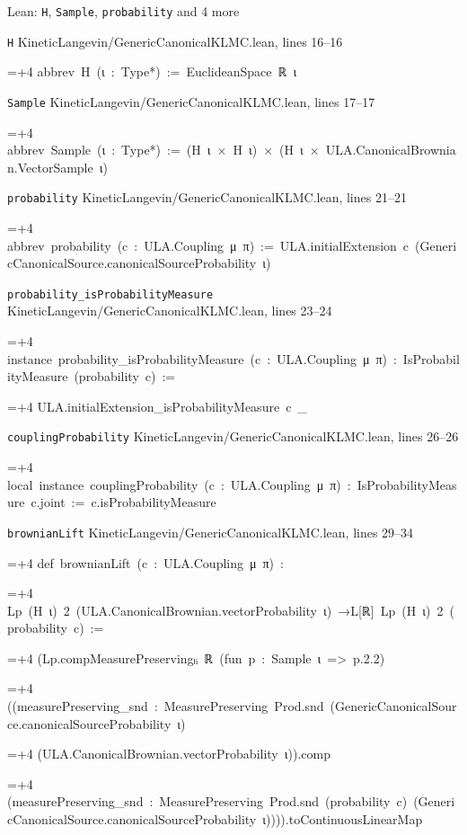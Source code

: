 \documentclass[11pt,a4paper]{article}
\newlength{\leancharwidth}
\newenvironment{leancode}{\par\smallskip\begingroup\ttfamily\footnotesize\raggedright
  \settowidth{\leancharwidth}{M}\setlength{\parskip}{0pt}\setlength{\parindent}{0pt}
  \frenchspacing}{\par\endgroup\smallskip}
\newcommand{\leanline}[2]{\hangindent=\dimexpr#1\leancharwidth+4\leancharwidth\relax
  \hangafter=1\noindent\hspace*{#1\leancharwidth}#2\par}
\newcommand{\leansource}[1]{\par{\footnotesize\color{leanmuted}#1}\par}
\begin{document}
\begin{leanbox}{Lean: \texttt{H}, \texttt{Sample}, \texttt{probability} and 4 more}
\leansource{\texttt{H} \quad KineticLangevin/\allowbreak{}GenericCanonicalKLMC.lean, lines 16–16}
\begin{leancode}
\leanline{0}{abbrev\ H\ (ι\ :\ Type*)\ :=\ EuclideanSpace\ ℝ\ ι}
\end{leancode}
\leansource{\texttt{Sample} \quad KineticLangevin/\allowbreak{}GenericCanonicalKLMC.lean, lines 17–17}
\begin{leancode}
\leanline{0}{abbrev\ Sample\ (ι\ :\ Type*)\ :=\ (H\ ι\ ×\ H\ ι)\ ×\ (H\ ι\ ×\ ULA.CanonicalBrownian.VectorSample\ ι)}
\end{leancode}
\leansource{\texttt{probability} \quad KineticLangevin/\allowbreak{}GenericCanonicalKLMC.lean, lines 21–21}
\begin{leancode}
\leanline{0}{abbrev\ probability\ (c\ :\ ULA.Coupling\ μ\ π)\ :=\ ULA.initialExtension\ c\ (GenericCanonicalSource.canonicalSourceProbability\ ι)}
\end{leancode}
\leansource{\texttt{probability\_\allowbreak{}isProbabilityMeasure} \quad KineticLangevin/\allowbreak{}GenericCanonicalKLMC.lean, lines 23–24}
\begin{leancode}
\leanline{0}{instance\ probability\_isProbabilityMeasure\ (c\ :\ ULA.Coupling\ μ\ π)\ :\ IsProbabilityMeasure\ (probability\ c)\ :=}
\leanline{2}{ULA.initialExtension\_isProbabilityMeasure\ c\ \_}
\end{leancode}
\leansource{\texttt{couplingProbability} \quad KineticLangevin/\allowbreak{}GenericCanonicalKLMC.lean, lines 26–26}
\begin{leancode}
\leanline{0}{local\ instance\ couplingProbability\ (c\ :\ ULA.Coupling\ μ\ π)\ :\ IsProbabilityMeasure\ c.joint\ :=\ c.isProbabilityMeasure}
\end{leancode}
\leansource{\texttt{brownianLift} \quad KineticLangevin/\allowbreak{}GenericCanonicalKLMC.lean, lines 29–34}
\begin{leancode}
\leanline{0}{def\ brownianLift\ (c\ :\ ULA.Coupling\ μ\ π)\ :}
\leanline{4}{Lp\ (H\ ι)\ 2\ (ULA.CanonicalBrownian.vectorProbability\ ι)\ →L[ℝ]\ Lp\ (H\ ι)\ 2\ (probability\ c)\ :=}
\leanline{2}{(Lp.compMeasurePreservingₗᵢ\ ℝ\ (fun\ p\ :\ Sample\ ι\ =>\ p.2.2)}
\leanline{4}{((measurePreserving\_snd\ :\ MeasurePreserving\ Prod.snd\ (GenericCanonicalSource.canonicalSourceProbability\ ι)}
\leanline{6}{(ULA.CanonicalBrownian.vectorProbability\ ι)).comp}
\leanline{6}{(measurePreserving\_snd\ :\ MeasurePreserving\ Prod.snd\ (probability\ c)\ (GenericCanonicalSource.canonicalSourceProbability\ ι)))).toContinuousLinearMap}

\end{leancode}
\end{leanbox}
\end{document}

